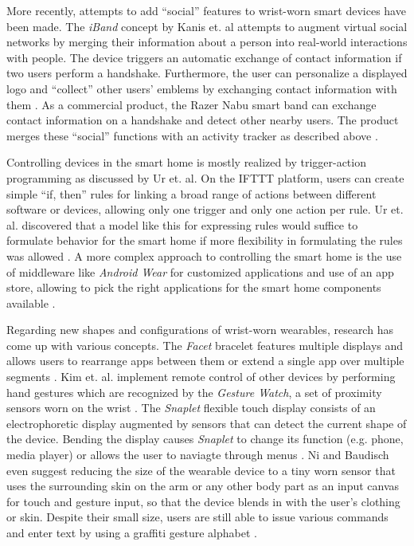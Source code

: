 More recently, attempts to add ``social'' features to wrist-worn smart devices have been made. The \textit{iBand} concept by Kanis et. al attempts to augment virtual social networks by merging their information about a person into real-world interactions with people. The device  triggers an automatic exchange of contact information if two users perform a handshake. Furthermore, the user can personalize a displayed logo and ``collect'' other users' emblems by exchanging contact information with them \cite{Kanis2005}. As a commercial product, the Razer Nabu smart band can exchange contact information on a handshake and detect other nearby users. The product merges these ``social'' functions with an activity tracker as described above \cite{razernabu}.

Controlling devices in the smart home is mostly realized by trigger-action programming as discussed by Ur et. al. On the IFTTT platform, users can create simple ``if, then'' rules for linking a broad range of actions between different software or devices, allowing only one trigger and only one action per rule. Ur et. al. discovered that a model like this for expressing rules would suffice to formulate behavior for the smart home if more flexibility in formulating the rules was allowed \cite{Ur2014}. A more complex approach to controlling the smart home is the use of middleware like \textit{Android Wear} for customized applications and use of an app store, allowing to pick the right applications for the smart home components available \cite{androidwear}.

Regarding new shapes and configurations of wrist-worn wearables, research has come up with various concepts. The \textit{Facet} bracelet features multiple displays and allows users to rearrange apps between them or extend a single app over multiple segments \cite{Lyons2012}. Kim et. al. implement remote control of other devices by performing hand gestures which are recognized by the \textit{Gesture Watch}, a set of proximity sensors worn on the wrist \cite{Kim2007}. The \textit{Snaplet} flexible touch display consists of an electrophoretic display augmented by sensors that can detect the current shape of the device. Bending the display causes \textit{Snaplet} to change its function (e.g. phone, media player) or allows the user to naviagte through menus \cite{Tarun2011}. Ni and Baudisch even suggest reducing the size of the wearable device to a tiny worn sensor that uses the surrounding skin on the arm or any other body part as an input canvas for touch and gesture input, so that the device blends in with the user's clothing or skin. Despite their small size, users are still able to issue various commands and enter text by using a graffiti gesture alphabet \cite{Ni2009}.

